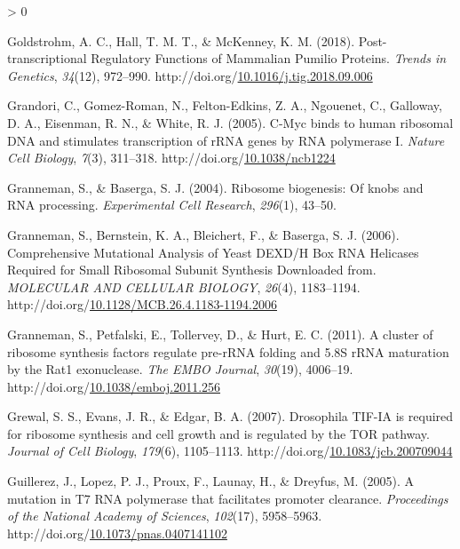 \documentclass[12pt,oneside]{reedthesis}
\newlength{\cslhangindent}
\newenvironment{CSLReferences}[2] %
 {%
  \setlength{\parindent}{0pt}
  \ifodd #1 \everypar{\setlength{\hangindent}{\cslhangindent}}\ignorespaces\fi
  \ifnum #2 > 0
  \setlength{\parskip}{#2\baselineskip}
  \fi
 }%
 {}
\begin{document}
\begin{CSLReferences}{1}{0}
\leavevmode\hypertarget{ref-Goldstrohm2018c}{}%
Goldstrohm, A. C., Hall, T. M. T., \& McKenney, K. M. (2018). Post-transcriptional {Regulatory Functions} of {Mammalian Pumilio Proteins}. \emph{Trends in Genetics}, \emph{34}(12), 972--990. http://doi.org/\href{https://doi.org/10.1016/j.tig.2018.09.006}{10.1016/j.tig.2018.09.006}

\leavevmode\hypertarget{ref-grandoriCMycBindsHuman2005}{}%
Grandori, C., Gomez-Roman, N., Felton-Edkins, Z. A., Ngouenet, C., Galloway, D. A., Eisenman, R. N., \& White, R. J. (2005). C-{Myc} binds to human ribosomal {DNA} and stimulates transcription of {rRNA} genes by {RNA} polymerase {I}. \emph{Nature Cell Biology}, \emph{7}(3), 311--318. http://doi.org/\href{https://doi.org/10.1038/ncb1224}{10.1038/ncb1224}

\leavevmode\hypertarget{ref-Granneman2004a}{}%
Granneman, S., \& Baserga, S. J. (2004). Ribosome biogenesis: Of knobs and {RNA} processing. \emph{Experimental Cell Research}, \emph{296}(1), 43--50.

\leavevmode\hypertarget{ref-Granneman2006}{}%
Granneman, S., Bernstein, K. A., Bleichert, F., \& Baserga, S. J. (2006). Comprehensive {Mutational Analysis} of {Yeast DEXD}/{H Box RNA Helicases Required} for {Small Ribosomal Subunit Synthesis Downloaded} from. \emph{MOLECULAR AND CELLULAR BIOLOGY}, \emph{26}(4), 1183--1194. http://doi.org/\href{https://doi.org/10.1128/MCB.26.4.1183-1194.2006}{10.1128/MCB.26.4.1183-1194.2006}

\leavevmode\hypertarget{ref-Granneman2011}{}%
Granneman, S., Petfalski, E., Tollervey, D., \& Hurt, E. C. (2011). A cluster of ribosome synthesis factors regulate pre-{rRNA} folding and 5.{8S rRNA} maturation by the {Rat1} exonuclease. \emph{The EMBO Journal}, \emph{30}(19), 4006--19. http://doi.org/\href{https://doi.org/10.1038/emboj.2011.256}{10.1038/emboj.2011.256}

\leavevmode\hypertarget{ref-Grewal2007c}{}%
Grewal, S. S., Evans, J. R., \& Edgar, B. A. (2007). Drosophila {TIF}-{IA} is required for ribosome synthesis and cell growth and is regulated by the {TOR} pathway. \emph{Journal of Cell Biology}, \emph{179}(6), 1105--1113. http://doi.org/\href{https://doi.org/10.1083/jcb.200709044}{10.1083/jcb.200709044}

\leavevmode\hypertarget{ref-guillerezMutationT7RNA2005}{}%
Guillerez, J., Lopez, P. J., Proux, F., Launay, H., \& Dreyfus, M. (2005). A mutation in {T7 RNA} polymerase that facilitates promoter clearance. \emph{Proceedings of the National Academy of Sciences}, \emph{102}(17), 5958--5963. http://doi.org/\href{https://doi.org/10.1073/pnas.0407141102}{10.1073/pnas.0407141102}


\end{CSLReferences}
\end{document}
